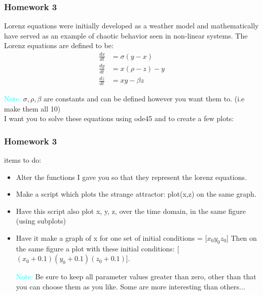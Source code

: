 \documentclass{beamer}
\begin{document}
\begin{frame}
\frametitle{Homework 3}

Lorenz equations were initially developed as a weather model and mathematically have served as an example of chaotic behavior seen in non-linear systems. The Lorenz equations are defined to be: \\
\begin{align*}
\frac{dx}{dt} &= \sigma(y-x)\\
\frac{dy}{dt} &= x(\rho-z)-y\\
\frac{dz}{dt} &= xy- \beta z
\end{align*}

\textcolor{cyan}{Note:} $\sigma, \rho, \beta$ are constants and can be defined however you want them to. (i.e make them all 10) \\
I want you to solve these equations using ode45 and to create a few plots:
\end{frame}

\begin{frame}
\frametitle{Homework 3} 
items to do: 

\begin{itemize}
\item Alter the functions I gave you so that they represent the lorenz equations.
\item Make a script which plots the strange attractor: plot(x,z) on the same graph. 
\item Have this script also plot x, y, z, over the time domain, in the same figure (using subplots) 
\item Have it make a graph of x for one set of initial conditions = [$x_0 y_0 z_0$] Then on the same figure a plot with these initial conditions: 
[$(x_0+0.1) (y_0+ 0.1) (z_0 + 0.1)$]. 

\textcolor{cyan}{Note:} Be sure to keep all parameter values greater than zero, other than that you can choose them as you like. Some are more interesting than others...
\end{itemize}
\end{frame}
\end{document}
